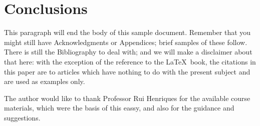 \section{Conclusions}
This paragraph will end the body of this sample document.
Remember that you might still have Acknowledgments or
Appendices; brief samples of these
follow.  There is still the Bibliography to deal with; and
we will make a disclaimer about that here: with the exception
of the reference to the \LaTeX\ book, the citations in
this paper are to articles which have nothing to
do with the present subject and are used as
examples only.




\begin{acks}
  The author would like to thank Professor Rui Henriques for the available course materials, which were the basis of this eassy, and also for the guidance and suggestions.

\end{acks}
